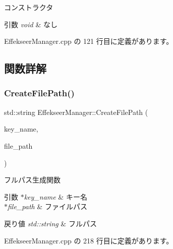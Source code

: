 コンストラクタ 


\begin{DoxyParams}{引数}
{\em void} & なし \\
\hline
\end{DoxyParams}


 Effekseer\+Manager.\+cpp の 121 行目に定義があります。



\subsection{関数詳解}
\mbox{\label{class_effekseer_manager_af66d941d5d5ece091e2c34f30bc14629}} 
\subsubsection{\texorpdfstring{Create\+File\+Path()}{CreateFilePath()}}
{\footnotesize\ttfamily std\+::string Effekseer\+Manager\+::\+Create\+File\+Path (\begin{DoxyParamCaption}\item[{const std\+::string $\ast$}]{key\+\_\+name,  }\item[{const std\+::string $\ast$}]{file\+\_\+path }\end{DoxyParamCaption})\hspace{0.3cm}{\ttfamily [private]}}



フルパス生成関数 


\begin{DoxyParams}{引数}
{\em $\ast$key\+\_\+name} & キー名 \\
\hline
{\em $\ast$file\+\_\+path} & ファイルパス \\
\hline
\end{DoxyParams}

\begin{DoxyRetVals}{戻り値}
{\em std\+::string} & フルパス \\
\hline
\end{DoxyRetVals}


 Effekseer\+Manager.\+cpp の 218 行目に定義があります。

\mbox{\label{class_effekseer_manager_a3912b786ddd6fd3ce2f32bab099c6312}} 

